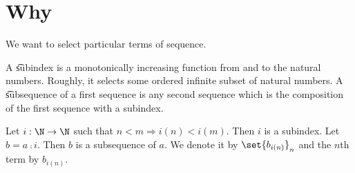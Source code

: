 

\section*{Why}

We want to select particular terms of sequence.

A \t{subindex} is a monotonically increasing function from and to the natural numbers.
Roughly, it selects some ordered infinite subset of natural numbers.
A \t{subsequence} of a first sequence is any second sequence which is the composition of the first sequence with a subindex.


Let $i: \N   \to \N  $ such that $n < m \Rightarrow i(n) < i(m)$.
Then $i$ is a subindex.
Let $b = a \comp i$.
Then $b$ is a subsequence of $a$.
We denote it by $\set{b_{i(n)}}_n$ and the $n$th term by $b_{i(n)}$.

\blankpage
